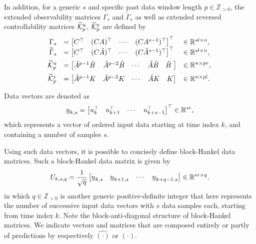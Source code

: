 In addition, for a generic $s$ and specific past data window length $p\in\mathbb{Z}_{>0}$, the extended observability matrices $\Gamma_s$ and $\widetilde{\Gamma}_s$ as well as extended reversed controllability matrices $\widetilde{\mathcal{K}}_{p}^{\mathrm{{u}}}$, $\widetilde{\mathcal{K}}_{p}^{\mathrm{{y}}}$ are defined by
$$\begin{array}{rll}
\Gamma_s &= \begin{bmatrix}C^\top & (CA)^\top & \cdots & (CA^{s-1})^\top\end{bmatrix}^\top&\in\mathbb{R}^{sl\times n},\\
\widetilde{\Gamma}_s &= \begin{bmatrix}C^\top & (C\tilde{A})^\top & \cdots & (C\tilde{A}^{s-1})^\top\end{bmatrix}^\top&\in\mathbb{R}^{sl\times n},\\
\tKp{u} &= \begin{bmatrix} \tilde{A}^{p-1}\tilde{B}\, & \tilde{A}^{p-2}\tilde{B} & \cdots & \tilde{A}\tilde{B} & \tilde{B}\,\,\end{bmatrix}&\in\mathbb{R}^{n\times pr},\vphantom{\bigg|}\\%
\tKp{y} &= \begin{bmatrix} \tilde{A}^{p-1}K & \tilde{A}^{p-2}K & \cdots & \tilde{A}K & K \end{bmatrix}&\in\mathbb{R}^{n\times pl}.
\end{array}$$

Data vectors are denoted as
\begin{align*}
    \underline{u}_{k,s} = \begin{bmatrix} u_k^\top & u_{k+1}^\top & \cdots & u_{k+s-1}^\top\end{bmatrix}^\top\in\mathbb{R}^{sr},
\end{align*}
which represents a vector of ordered input data starting at time index $k$, and containing a number of samples $s$.

Using such data vectors, it is possible to concisely define block-Hankel data matrices. Such a block-Hankel data matrix is given by
\begin{align*}
    U_{k,s,q} = \frac{1}{\sqrt{q}}\begin{bmatrix}
        \underline{u}_{k,s} & \underline{u}_{k+1,s} & \cdots & \underline{u}_{k+q-1,s}
    \end{bmatrix}\in\mathbb{R}^{sr\times q},
\end{align*}
in which $q\in\mathbb{Z}_{>0}$ is another generic positive-definite integer that here represents the number of successive input data vectors with $s$ data samples each, starting from time index $k$. Note the block-anti-diagonal structure of block-Hankel matrices. We indicate vectors and matrices that are composed entirely or partly of predictions by respectively $\hat{(\cdot)}$ or $\overline{(\cdot)}$. 

